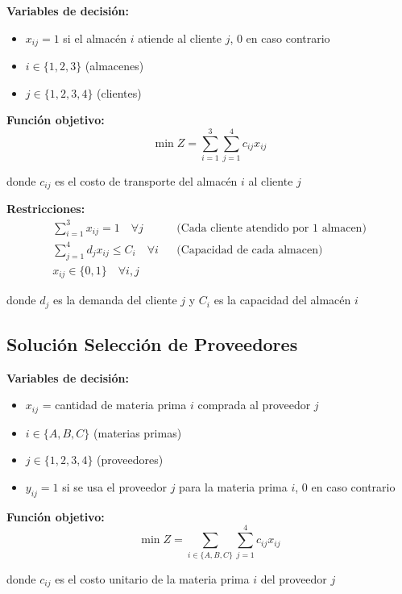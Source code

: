 \documentclass[12pt]{article}
\begin{document}
\textbf{Variables de decisión:}
\begin{itemize}
    \item $x_{ij} = 1$ si el almacén $i$ atiende al cliente $j$, 0 en caso contrario
    \item $i \in \{1, 2, 3\}$ (almacenes)
    \item $j \in \{1, 2, 3, 4\}$ (clientes)
\end{itemize}

\textbf{Función objetivo:}
$$\min Z = \sum_{i=1}^{3} \sum_{j=1}^{4} c_{ij} x_{ij}$$
\begin{center}
donde $c_{ij}$ es el costo de transporte del almacén $i$ al cliente $j$
\end{center}

\textbf{Restricciones:}
\begin{align*}
    \sum_{i=1}^{3} x_{ij} = 1 \quad \forall j && \text{(Cada cliente atendido por 1 almacen)} \\
    \sum_{j=1}^{4} d_j x_{ij} \leq C_i \quad \forall i && \text{(Capacidad de cada almacen)} \\
    x_{ij} \in \{0,1\} \quad \forall i,j
\end{align*}
\begin{center}
donde $d_j$ es la demanda del cliente $j$ y $C_i$ es la capacidad del almacén $i$
\end{center}

\subsection{Solución Selección de Proveedores}

\textbf{Variables de decisión:}
\begin{itemize}
    \item $x_{ij}$ = cantidad de materia prima $i$ comprada al proveedor $j$
    \item $i \in \{A, B, C\}$ (materias primas)
    \item $j \in \{1, 2, 3, 4\}$ (proveedores)
    \item $y_{ij} = 1$ si se usa el proveedor $j$ para la materia prima $i$, 0 en caso contrario
\end{itemize}

\textbf{Función objetivo:}
$$\min Z = \sum_{i \in \{A,B,C\}} \sum_{j=1}^{4} c_{ij} x_{ij}$$
\begin{center}
donde $c_{ij}$ es el costo unitario de la materia prima $i$ del proveedor $j$
\end{center}
\end{document}
